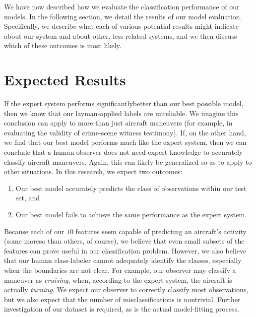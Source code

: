 \documentclass[11pt]{article}
\begin{document}

We have now described how we evaluate the classification performance of our models. In the following section, we detail the results of our model evaluation. Specifically, we describe what each of various potential results might indicate about our system and about other, less-related systems, and we then discuss which of these outcomes is most likely.

\section{Expected Results}


\renewcommand*{\thefootnote}{\fnsymbol{footnote}}
If the expert system performs significantly\footnotemark[2] better than our best possible model, then we know that our layman-applied labels are unreliable. We imagine this conclusion can apply to more than just aircraft maneuvers (for example, in evaluating the validity of crime-scene witness testimony). If, on the other hand, we find that our best model performs much like the expert system, then we can conclude that a human observer does not need expert knowledge to accurately classify aircraft maneuvers. Again, this can likely be generalized so as to apply to other situations. In this research, we expect two outcomes:

\begin{enumerate}
    \item Our best model accurately predicts the class of observations within our test set, and
    \item Our best model fails to achieve the same performance as the expert system.
\end{enumerate}

\noindent Because each of our $10$ features seem capable of predicting an aircraft's activity (some moreso than others, of course), we believe that even small subsets of the features can prove useful in our classification problem. However, we also believe that our human class-labeler cannot adequately identify the classes, especially when the boundaries are not clear. For example, our observer may classify a maneuver as \textit{cruising}, when, according to the expert system, the aircraft is actually \textit{turning}. We expect our observer to correctly classify most observations, but we also expect that the number of misclassifications is nontrivial. Further investigation of our dataset is required, as is the actual model-fitting process.
\end{document}
